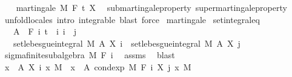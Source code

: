 \begin{isabellebody}
\ \ \isamarkupfalse%
\ {\isachardoublequoteopen}martingale\ M\ F\ t\ X{\isachardoublequoteclose}\ \isamarkupfalse%
\ submartingale{\isacharunderscore}{\kern0pt}property\ supermartingale{\isacharunderscore}{\kern0pt}property\ \isamarkupfalse%
\ {\isacharparenleft}{\kern0pt}unfold{\isacharunderscore}{\kern0pt}locales{\isacharparenright}{\kern0pt}\ {\isacharparenleft}{\kern0pt}intro\ integrable{\isacharcomma}{\kern0pt}\ blast{\isacharcomma}{\kern0pt}\ force{\isacharparenright}{\kern0pt}\isanewline
{}\isamarkupfalse%
%
\endisatagproof
{\isafoldproof}%
%
\isadelimproof
%
\endisadelimproof
%
\isadelimdocument
%
\endisadelimdocument
%
\isatagdocument
%
\isamarkuptrue%
%
\endisatagdocument
{\isafolddocument}%
%
\isadelimdocument
%
\endisadelimdocument
{}\isamarkupfalse%
\ martingale\isanewline
{}\isanewline
\isanewline
{}\isamarkupfalse%
\ set{\isacharunderscore}{\kern0pt}integral{\isacharunderscore}{\kern0pt}eq{\isacharcolon}{\kern0pt}\isanewline
\ \ \ {\isachardoublequoteopen}A\ {\isasymin}\ F\ i{\isachardoublequoteclose}\ {\isachardoublequoteopen}t\ {\isasymle}\ i{\isachardoublequoteclose}\ {\isachardoublequoteopen}i\ {\isasymle}\ j{\isachardoublequoteclose}\isanewline
\ \ \ {\isachardoublequoteopen}set{\isacharunderscore}{\kern0pt}lebesgue{\isacharunderscore}{\kern0pt}integral\ M\ A\ {\isacharparenleft}{\kern0pt}X\ i{\isacharparenright}{\kern0pt}\ {\isacharequal}{\kern0pt}\ set{\isacharunderscore}{\kern0pt}lebesgue{\isacharunderscore}{\kern0pt}integral\ M\ A\ {\isacharparenleft}{\kern0pt}X\ j{\isacharparenright}{\kern0pt}{\isachardoublequoteclose}\isanewline
%
\isadelimproof
%
\endisadelimproof
%
\isatagproof
{}\isamarkupfalse%
\ {\isacharminus}{\kern0pt}\isanewline
\ \ \isamarkupfalse%
\ sigma{\isacharunderscore}{\kern0pt}finite{\isacharunderscore}{\kern0pt}subalgebra\ M\ {\isachardoublequoteopen}F\ i{\isachardoublequoteclose}\ \isamarkupfalse%
\ assms{\isacharparenleft}{\kern0pt}{}{\isacharparenright}{\kern0pt}\ \isamarkupfalse%
\ blast\isanewline
\ \ \isamarkupfalse%
\ {\isachardoublequoteopen}{\isasymintegral}x\ {\isasymin}\ A{\isachardot}{\kern0pt}\ X\ i\ x\ {\isasympartial}M\ {\isacharequal}{\kern0pt}\ {\isasymintegral}x\ {\isasymin}\ A{\isachardot}{\kern0pt}\ cond{\isacharunderscore}{\kern0pt}exp\ M\ {\isacharparenleft}{\kern0pt}F\ i{\isacharparenright}{\kern0pt}\ {\isacharparenleft}{\kern0pt}X\ j{\isacharparenright}{\kern0pt}\ x\ {\isasympartial}M{\isachardoublequoteclose}\ \isamarkupfalse%

\end{isabellebody}
